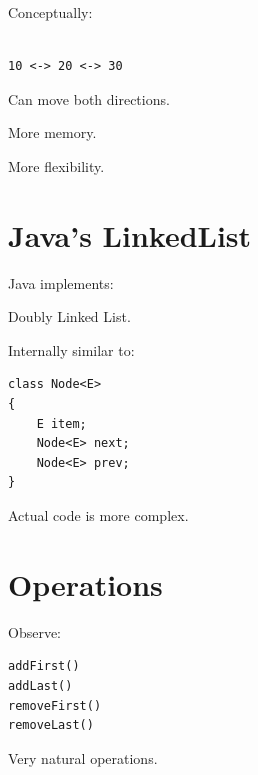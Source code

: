 \documentclass[11pt,a4paper]{book}
\begin{document}
Conceptually:

\begin{verbatim}

10 <-> 20 <-> 30

\end{verbatim}


Can move both directions.


More memory.


More flexibility.


\section{Java's LinkedList}

Java implements:


Doubly Linked List.


Internally similar to:

\begin{verbatim} 
class Node<E>
{
    E item;
    Node<E> next;
    Node<E> prev;
}
\end{verbatim}


Actual code is more complex.


\section{Operations}

Observe:

\begin{verbatim} 
addFirst()
addLast()
removeFirst()
removeLast()
\end{verbatim}


Very natural operations.
\end{document}
